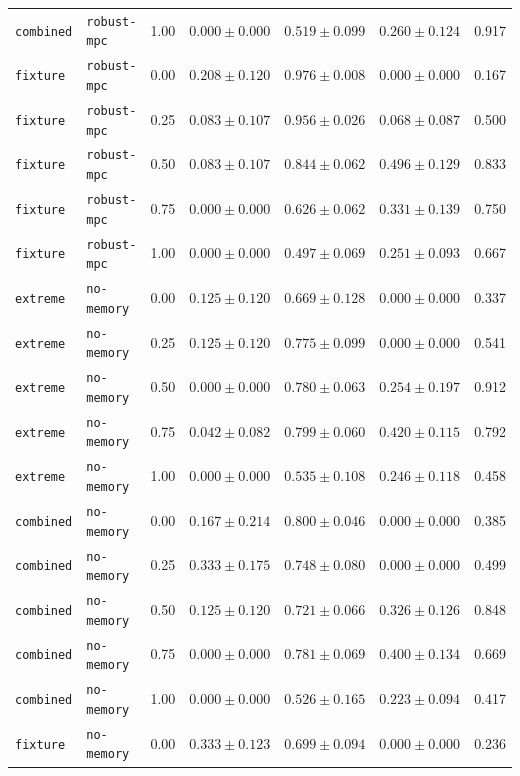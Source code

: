 \documentclass{article}
\begin{document}
\begin{center}
\begin{tabular}{lllcccc}
\texttt{combined} & \texttt{robust-mpc} & 1.00 & $0.000 \pm 0.000$ & $0.519 \pm 0.099$ & $0.260 \pm 0.124$ & 0.917 \\
\texttt{fixture} & \texttt{robust-mpc} & 0.00 & $0.208 \pm 0.120$ & $0.976 \pm 0.008$ & $0.000 \pm 0.000$ & 0.167 \\
\texttt{fixture} & \texttt{robust-mpc} & 0.25 & $0.083 \pm 0.107$ & $0.956 \pm 0.026$ & $0.068 \pm 0.087$ & 0.500 \\
\texttt{fixture} & \texttt{robust-mpc} & 0.50 & $0.083 \pm 0.107$ & $0.844 \pm 0.062$ & $0.496 \pm 0.129$ & 0.833 \\
\texttt{fixture} & \texttt{robust-mpc} & 0.75 & $0.000 \pm 0.000$ & $0.626 \pm 0.062$ & $0.331 \pm 0.139$ & 0.750 \\
\texttt{fixture} & \texttt{robust-mpc} & 1.00 & $0.000 \pm 0.000$ & $0.497 \pm 0.069$ & $0.251 \pm 0.093$ & 0.667 \\
\texttt{extreme} & \texttt{no-memory} & 0.00 & $0.125 \pm 0.120$ & $0.669 \pm 0.128$ & $0.000 \pm 0.000$ & 0.337 \\
\texttt{extreme} & \texttt{no-memory} & 0.25 & $0.125 \pm 0.120$ & $0.775 \pm 0.099$ & $0.000 \pm 0.000$ & 0.541 \\
\texttt{extreme} & \texttt{no-memory} & 0.50 & $0.000 \pm 0.000$ & $0.780 \pm 0.063$ & $0.254 \pm 0.197$ & 0.912 \\
\texttt{extreme} & \texttt{no-memory} & 0.75 & $0.042 \pm 0.082$ & $0.799 \pm 0.060$ & $0.420 \pm 0.115$ & 0.792 \\
\texttt{extreme} & \texttt{no-memory} & 1.00 & $0.000 \pm 0.000$ & $0.535 \pm 0.108$ & $0.246 \pm 0.118$ & 0.458 \\
\texttt{combined} & \texttt{no-memory} & 0.00 & $0.167 \pm 0.214$ & $0.800 \pm 0.046$ & $0.000 \pm 0.000$ & 0.385 \\
\texttt{combined} & \texttt{no-memory} & 0.25 & $0.333 \pm 0.175$ & $0.748 \pm 0.080$ & $0.000 \pm 0.000$ & 0.499 \\
\texttt{combined} & \texttt{no-memory} & 0.50 & $0.125 \pm 0.120$ & $0.721 \pm 0.066$ & $0.326 \pm 0.126$ & 0.848 \\
\texttt{combined} & \texttt{no-memory} & 0.75 & $0.000 \pm 0.000$ & $0.781 \pm 0.069$ & $0.400 \pm 0.134$ & 0.669 \\
\texttt{combined} & \texttt{no-memory} & 1.00 & $0.000 \pm 0.000$ & $0.526 \pm 0.165$ & $0.223 \pm 0.094$ & 0.417 \\
\texttt{fixture} & \texttt{no-memory} & 0.00 & $0.333 \pm 0.123$ & $0.699 \pm 0.094$ & $0.000 \pm 0.000$ & 0.236 \\

\end{tabular}
\end{center}
\end{document}

